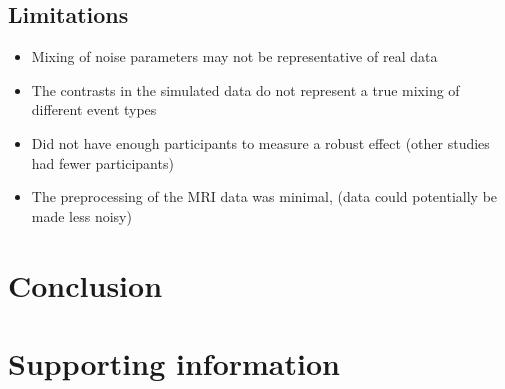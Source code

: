 \documentclass[10pt,letterpaper]{article}
\begin{document}
\subsection{Limitations}

\begin{itemize}
  \item Mixing of noise parameters may not be representative of real data
  \item The contrasts in the simulated data do not represent a true mixing of different event types
  \item Did not have enough participants to measure a robust effect (other studies had fewer participants)
  \item The preprocessing of the MRI data was minimal, (data could potentially be made less noisy)
\end{itemize}

\section*{Conclusion}



\section*{Supporting information}

\end{document}

